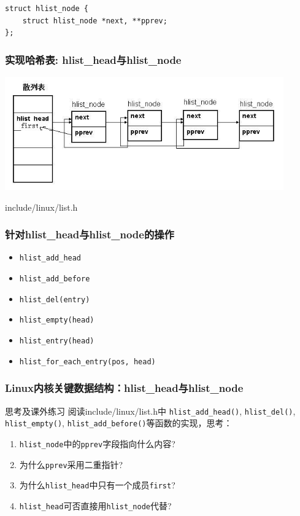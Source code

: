\documentclass[xcolor=svgnames]{beamer}
\begin{document}
\begin{CJK*}{UTF8}{gbsn}
{\begin{lstlisting}[tabsize=8,basicstyle=\ttfamily]
struct hlist_node {
    struct hlist_node *next, **pprev;
};
\end{lstlisting}
}
\begin{frame}[fragile]
\frametitle{实现哈希表: hlist\_head与hlist\_node}
\includegraphics[width=0.9\textwidth]{hlist.jpeg}
\begin{block}{include/linux/list.h}
\lsthlist
\end{block}
\end{frame}

\begin{frame}[fragile]
\frametitle{针对hlist\_head与hlist\_node的操作}
\begin{itemize}
\item \verb|hlist_add_head|
\item \verb|hlist_add_before|
\item \verb|hlist_del(entry)|
\item \verb|hlist_empty(head)| 
\item \verb|hlist_entry(head)| 
\item \verb|hlist_for_each_entry(pos, head)|
\end{itemize}
\end{frame}

\begin{frame}[fragile]
\frametitle{Linux内核关键数据结构：hlist\_head与hlist\_node}
\begin{block}{思考及课外练习}
阅读include/linux/list.h中
\verb|hlist_add_head()|, \verb|hlist_del()|, \verb|hlist_empty()|, \verb|hlist_add_before()|等函数的实现，思考：

\begin{enumerate}
\item \verb|hlist_node|中的\verb|pprev|字段指向什么内容?
\item 为什么\verb|pprev|采用二重指针?
\item 为什么\verb|hlist_head|中只有一个成员\verb|first|?
\item \verb|hlist_head|可否直接用\verb|hlist_node|代替?
\end{enumerate}
\end{block}
\end{frame}


\end{CJK*}
\end{document}
